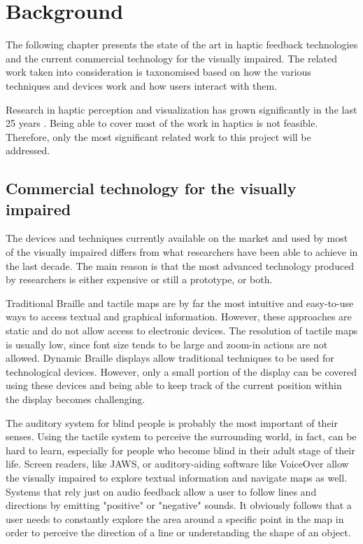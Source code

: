 \chapter{Background}

The following chapter presents the state of the art in haptic feedback technologies and the current commercial technology for the visually impaired. The related work taken into consideration is taxonomised based on how the various techniques and devices work and how users interact with them.

Research in haptic perception and visualization has grown significantly in the last 25 years \cite{roberts2007we}. Being able to cover most of the work in haptics is not feasible. Therefore, only the most significant related work to this project will be addressed.

\section{Commercial technology for the visually impaired}
The devices and techniques currently available on the market and used by most of the visually impaired differs from what researchers have been able to achieve in the last decade. The main reason is that the most advanced technology produced by researchers is either expensive or still a prototype, or both. 

Traditional Braille and tactile maps are by far the most intuitive and easy-to-use ways to access textual and graphical information. However, these approaches are static and do not allow access to electronic devices. The resolution of tactile maps is usually low, since font size tends to be large and zoom-in actions are not allowed. Dynamic Braille displays \cite{HumanWare, shimada2010development, blindMaps} allow traditional techniques to be used for technological devices. However, only a small portion of the display can be covered using these devices and being able to keep track of the current position within the display becomes challenging.

The auditory system for blind people is probably the most important of their senses. Using the tactile system to perceive the surrounding world, in fact, can be hard to learn, especially for people who become blind in their adult stage of their life. Screen readers, like JAWS, or auditory-aiding software like VoiceOver\cite{voiceOver} allow the visually impaired to explore textual information and navigate maps as well. Systems that rely just on audio feedback allow a user to follow lines and directions by emitting "positive" or "negative" sounds. It obviously follows that a user needs to constantly explore the area around a specific point in the map in order to perceive the direction of a line or understanding the shape of an object.    
    
